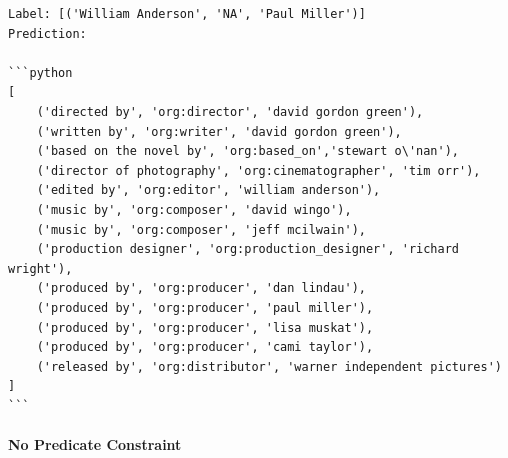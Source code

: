 \documentclass{article}
\begin{document}
\begin{lstlisting}
Label: [('William Anderson', 'NA', 'Paul Miller')]
Prediction:

```python
[
    ('directed by', 'org:director', 'david gordon green'),
    ('written by', 'org:writer', 'david gordon green'),
    ('based on the novel by', 'org:based_on','stewart o\'nan'),
    ('director of photography', 'org:cinematographer', 'tim orr'),
    ('edited by', 'org:editor', 'william anderson'),
    ('music by', 'org:composer', 'david wingo'),
    ('music by', 'org:composer', 'jeff mcilwain'),
    ('production designer', 'org:production_designer', 'richard wright'),
    ('produced by', 'org:producer', 'dan lindau'),
    ('produced by', 'org:producer', 'paul miller'),
    ('produced by', 'org:producer', 'lisa muskat'),
    ('produced by', 'org:producer', 'cami taylor'),
    ('released by', 'org:distributor', 'warner independent pictures')
]
```
\end{lstlisting}
\paragraph{No Predicate Constraint}
\end{document}
